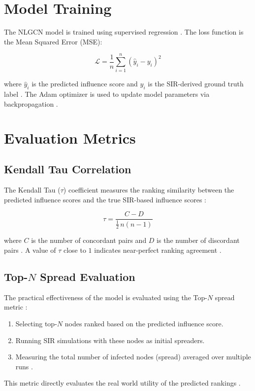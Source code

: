\section{Model Training}

The NLGCN model is trained using supervised regression \cite{guo2026}. 
The loss function is the Mean Squared Error (MSE):

\begin{equation}
\mathcal{L} = \frac{1}{n} \sum_{i=1}^{n} \left(\hat{y}_i - 
y_i\right)^2
\end{equation}

\noindent where $\hat{y}_i$ is the predicted influence score and $y_i$ 
is the SIR-derived ground truth label \cite{guo2026}. The Adam 
optimizer is used to update model parameters via backpropagation 
\cite{tu2025, patel2025}.

\section{Evaluation Metrics}

\subsection{Kendall Tau Correlation}

The Kendall Tau ($\tau$) coefficient measures the ranking similarity 
between the predicted influence scores and the true SIR-based 
influence scores \cite{ mukhtar}:

\begin{equation}
\tau = \frac{C - D}{\frac{1}{2}\,n(n-1)}
\end{equation}

\noindent where $C$ is the number of concordant pairs and $D$ is the 
number of discordant pairs . A value of $\tau$ close to 
$1$ indicates near-perfect ranking agreement \cite{guo2026, mukhtar}.

\subsection{Top-$N$ Spread Evaluation}

The practical effectiveness of the model is evaluated using the 
Top-$N$ spread metric \cite{guo2026, chen2012}:
\begin{enumerate}
    \item Selecting top-$N$ nodes ranked based on the predicted influence score.
    \item Running SIR simulations with these nodes as initial spreaders.
    \item Measuring the total number of infected nodes (spread) averaged 
    over multiple runs \cite{chen2012}.
\end{enumerate}

This metric directly evaluates the real world utility of the predicted 
rankings \cite{guo2026}.